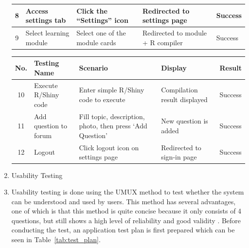 \documentclass[conference,a4paper]{IEEEtran}
\begin{document}
\begin{enumerate}[label=\alph*.]
\begin{table}[H]
\begin{tabular}{|c|p{1cm}|p{2cm}|p{2cm}|p{1cm}|}
            8            & Access settings tab     & Click the “Settings” icon                                  & Redirected to settings page       & Success         \\ \hline
            9            & Select learning module  & Select one of the module cards                             & Redirected to module + R compiler & Success         \\ \hline
          \end{tabular}
        \end{table}

        \begin{table}[H]
          \centering
          \scriptsize
          \label{tab:functional-part2}
          \begin{tabular}{|c|p{1cm}|p{2cm}|p{2cm}|p{1cm}|}
            \hline
            \textbf{No.} & \textbf{Testing Name} & \textbf{Scenario}                                         & \textbf{Display}             & \textbf{Result} \\ \hline
            10           & Execute R/Shiny code  & Enter simple R/Shiny code to execute                      & Compilation result displayed & Success         \\ \hline
            11           & Add question to forum & Fill topic, description, photo, then press ‘Add Question’ & New question is added        & Success         \\ \hline
            12           & Logout                & Click logout icon on settings page                        & Redirected to sign-in page   & Success         \\ \hline
          \end{tabular}
        \end{table}


  \item Usability Testing
  \item [] Usability testing is done using the UMUX method to test whether the system can be understood and used by users. This method has several advantages, one of which is that this method is quite concise because it only consists of 4 questions, but still shows a high level of reliability and good validity \cite{b26}. Before conducting the test, an application test plan is first prepared which can be seen in Table~\ref{tab:test_plan}.


\end{enumerate}
\end{document}
